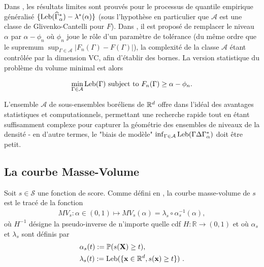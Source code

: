 Dans \cite{Polonik97}, les résultats limites sont prouvés pour le processus de quantile empirique généralisé $ \{\text{Leb} (\widehat {\Gamma}^*_{\alpha}) - \lambda^*(\alpha) \} $ (sous l'hypothèse en particulier que $ \mathcal{A} $ est une classe de Glivenko-Cantelli pour $ F $). Dans \cite {Scott2006}, il est proposé de remplacer le niveau $\alpha $ par $ \alpha- \phi_n $ où $ \phi_n $ joue le rôle d'un paramètre de tolérance (du même ordre que le supremum $\sup_{\Gamma\in \mathcal{A}}\vert F_n(\Gamma)-F(\Gamma) \vert$), la complexité de la classe $ \mathcal{A} $ étant contrôlée par la dimension {\sc VC}, afin d'établir des bornes. La version statistique du problème du volume minimal est alors

$$
\min_{\Gamma \in \mathcal{A}} \text{Leb}(\Gamma) \mbox{ subject to } F_n (\Gamma) \ge \alpha - \phi_n.
$$

L'ensemble $ \mathcal {A} $ de sous-ensembles boréliens de $ \mathbb{R}^d $ offre dans l'idéal des avantages statistiques et computationnels, permettant une recherche rapide tout en étant suffisamment complexe pour capturer la géométrie des ensembles de niveaux de la densité - en d'autre termes, le "biais de modèle" $ \inf_ {\Gamma \in \mathcal{A}} \text{Leb} (\Gamma \Delta \Gamma^*_\alpha) $ doit être petit.


\subsection{La courbe Masse-Volume}
\label{resume_fr:mv-curve}

Soit $s\in \mathcal{S}$ une fonction de score. Comme défini en \cite{CLEM13,CLEM14}, la courbe masse-volume de $s$ est le tracé de la fonction
\begin{align*}
MV_s : \alpha\in (0,1)\mapsto MV_s(\alpha) = \lambda_s \circ \alpha_s^{-1}(\alpha),
\end{align*}
où $ H ^ {- 1} $ désigne la pseudo-inverse de n'importe quelle cdf $H: \mathbb {R} \rightarrow (0,1) $ et où $ \alpha_s $ et $ \lambda_s $ sont définis par
\begin{equation}
\begin{aligned}
\label{resume_fr:eq:alpha_beta}
&\alpha_s(t):= \mathbb{P}(s(\mathbf X) \ge t), \\
&\lambda_s(t):=\text{Leb}(\{\mathbf x \in \mathbb{R}^d, s(\mathbf x) \ge t\})~.
\end{aligned}
\end{equation}
%

